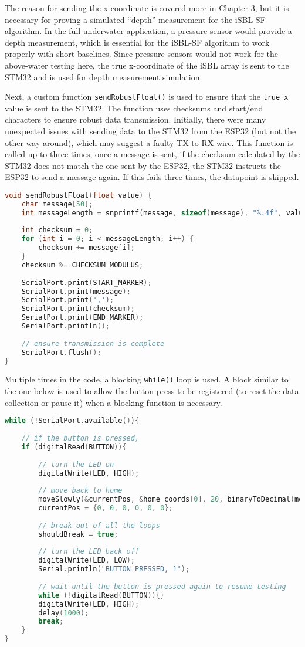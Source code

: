 \documentclass[12pt,a4paper]{report}
\begin{document}
The reason for sending the x-coordinate is covered more in Chapter 3, but it is necessary for proving a simulated “depth” measurement for the iSBL-SF algorithm. In the full underwater application, a pressure sensor would provide a depth measurement, which is essential for the iSBL-SF algorithm to work properly with short baselines. Since pressure sensors would not work for the above-water testing here, the true x-coordinate of the iSBL array is sent to the STM32 and is used for depth measurement simulation.

Next, a custom function \verb|sendRobustFloat()| is used to ensure that the \verb|true_x| value is sent to the STM32. The function uses checksums and start/end characters to ensure robust data transmission. Initially, there were many unexpected issues with sending data to the STM32 from the ESP32 (but not the other way around), which may suggest a faulty TX-to-RX wire. This function is called up to three times; once a message is sent, if the checksum calculated by the STM32 does not match the one sent by the ESP32, the STM32 instructs the ESP32 to send a message again. If this fails three times, the datapoint is skipped.

\begin{lstlisting}[language=C++]
void sendRobustFloat(float value) {
	char message[50];
	int messageLength = snprintf(message, sizeof(message), "%.4f", value);
	
	int checksum = 0;
	for (int i = 0; i < messageLength; i++) {
		checksum += message[i];
	}
	checksum %= CHECKSUM_MODULUS;
	
	SerialPort.print(START_MARKER);
	SerialPort.print(message);
	SerialPort.print(',');
	SerialPort.print(checksum);
	SerialPort.print(END_MARKER);
	SerialPort.println();
	
	// ensure transmission is complete
	SerialPort.flush();
}
\end{lstlisting}

Multiple times in the code, a blocking \verb|while()| loop is used. A block similar to the one below is used to allow the button press to be registered (to reset the data collection or pause it) when a blocking function is necessary.

\begin{lstlisting}[language=C++]
while (!SerialPort.available()){
	
	// if the button is pressed,
	if (digitalRead(BUTTON)){
		
		// turn the LED on
		digitalWrite(LED, HIGH);
		
		// move back to home
		moveSlowly(&currentPos, &home_coords[0], 20, binaryToDecimal(move_str));
		currentPos = {0, 0, 0, 0, 0, 0};
		
		// break out of all the loops
		shouldBreak = true;
		
		// turn the LED back off
		digitalWrite(LED, LOW);
		Serial.println("BUTTON PRESSED, 1");
		
		// wait until the button is pressed again to resume testing
		while (!digitalRead(BUTTON)){}
		digitalWrite(LED, HIGH);
		delay(1000);
		break;
	}
}
\end{lstlisting}
\end{document}
